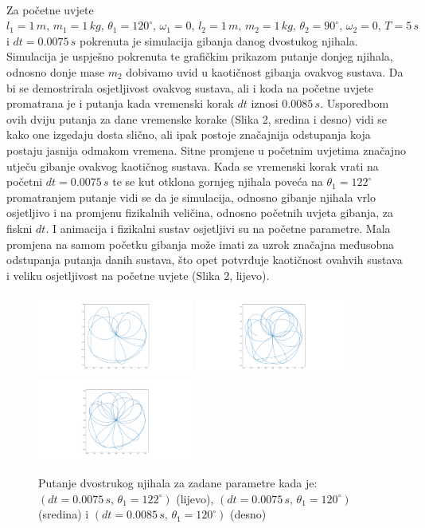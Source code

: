 \documentclass[a4paper,12pt]{article}
\begin{document}
\\
Za početne uvjete $l_1 = 1\, m,\, m_1 = 1\, kg,\, \theta_1 = 120^\circ,\, \omega_1 = 0,\,l_2 = 1\, m,\, m_2 = 1\, kg,\, \theta_2 = 90^\circ,\, \omega_2 = 0,\, T = 5\, s$ i $dt = 0.0075\,s$ pokrenuta je simulacija gibanja danog dvostukog njihala. Simulacija je uspješno pokrenuta te grafičkim prikazom putanje donjeg njihala, odnosno donje mase $m_2$ dobivamo uvid u kaotičnost gibanja ovakvog sustava. Da bi se demostrirala osjetljivost ovakvog sustava, ali i koda na početne uvjete promatrana je i putanja kada vremenski korak $dt$ iznosi $0.0085\, s$. Usporedbom ovih dviju putanja za dane vremenske korake (Slika 2, sredina i desno) vidi se kako one izgedaju dosta slično, ali ipak postoje značajnija odstupanja koja postaju jasnija odmakom vremena. Sitne promjene u početnim uvjetima značajno utječu gibanje ovakvog kaotičnog sustava. Kada se vremenski korak vrati na početni $dt = 0.0075\,s$ te se kut otklona gornjeg njihala poveća na $\theta_1 = 122^\circ$ promatranjem putanje vidi se da je simulacija, odnosno gibanje njihala vrlo osjetljivo i na promjenu fizikalnih veličina, odnosno početnih uvjeta gibanja, za fiskni $dt$. I animacija i fizikalni sustav osjetljivi su na početne parametre. Mala promjena na samom početku gibanja može imati za uzrok značajna međusobna odstupanja putanja danih sustava, što opet potvrđuje kaotičnost ovahvih sustava i veliku osjetljivost na početne uvjete (Slika 2, lijevo).
\begin{figure}[h!]
	\centering
	\includegraphics[width=5.1cm]{trajectory122.png}
	\includegraphics[width=5.1cm]{trajectory.png}	
	\includegraphics[width=5.1cm]{trajectory85.png}

	\caption{Putanje dvostrukog njihala za zadane parametre kada je: $(dt = 0.0075\,s,\,\theta_1 = 122^\circ)$ (lijevo), $(dt = 0.0075\,s,\,\theta_1 = 120^\circ)$ (sredina) i $(dt = 0.0085\,s,\,\theta_1 = 120^\circ)$ (desno)}
\end{figure}
\end{document}
